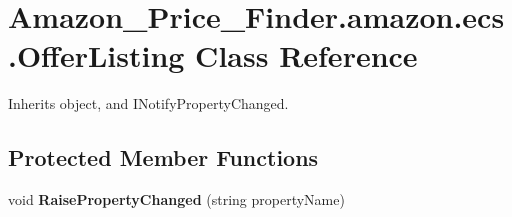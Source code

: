 \hypertarget{class_amazon___price___finder_1_1amazon_1_1ecs_1_1_offer_listing}{\section{Amazon\-\_\-\-Price\-\_\-\-Finder.\-amazon.\-ecs.\-Offer\-Listing Class Reference}
\label{class_amazon___price___finder_1_1amazon_1_1ecs_1_1_offer_listing}
}


 




Inherits object, and I\-Notify\-Property\-Changed.

\subsection*{Protected Member Functions}
\begin{DoxyCompactItemize}
\item 
\hypertarget{class_amazon___price___finder_1_1amazon_1_1ecs_1_1_offer_listing_a54257e8d6599312cf20de115556e4b44}{void {\bfseries Raise\-Property\-Changed} (string property\-Name)}\label{class_amazon___price___finder_1_1amazon_1_1ecs_1_1_offer_listing_a54257e8d6599312cf20de115556e4b44}

\end{DoxyCompactItemize}
